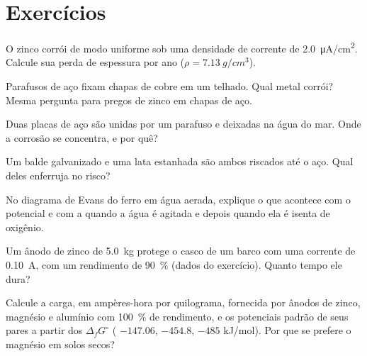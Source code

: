 \section{Exercícios}

\begin{exercise}[$\star$]\label{exo:b2:corrosion:1}
O zinco corrói de modo uniforme sob uma densidade de corrente de \qty{2.0}{\micro A/cm^2}.
Calcule sua perda de espessura por ano ($\rho = \qty{7.13}{g/cm^3}$).
\end{exercise}

\begin{exercise}[$\star$]\label{exo:b2:corrosion:2}
Parafusos de aço fixam chapas de cobre em um telhado. Qual metal corrói? Mesma
pergunta para pregos de zinco em chapas de aço.
\end{exercise}

\begin{exercise}[$\star$]\label{exo:b2:corrosion:3}
Duas placas de aço são unidas por um parafuso e deixadas na água do mar. Onde
a corrosão se concentra, e por quê?
\end{exercise}

\begin{exercise}[$\star$]\label{exo:b2:corrosion:4}
Um balde galvanizado e uma lata estanhada são ambos riscados até o aço. Qual
deles enferruja no risco?
\end{exercise}

\begin{exercise}[$\star\star$]\label{exo:b2:corrosion:5}
No diagrama de Evans do ferro em água aerada, explique o que acontece com o
potencial e com a  quando a água é agitada e depois quando
ela é isenta de oxigênio.
\end{exercise}

\begin{exercise}[$\star\star$]\label{exo:b2:corrosion:6}
Um ânodo de zinco de \qty{5.0}{kg} protege o casco de um barco com uma corrente
de \qty{0.10}{A}, com um rendimento de 90~\% (dados do exercício). Quanto tempo
ele dura?
\end{exercise}

\begin{exercise}[$\star\star$]\label{exo:b2:corrosion:7}
Calcule a carga, em ampères-hora por quilograma, fornecida por ânodos de
zinco, magnésio e alumínio com 100~\% de rendimento, e os potenciais padrão de
seus pares a partir dos $\Delta_f G^\circ$ ( $-147.06$,  $-454.8$,
 $-485$ \unit{kJ/mol}). Por que se prefere o magnésio em solos secos?
\end{exercise}

